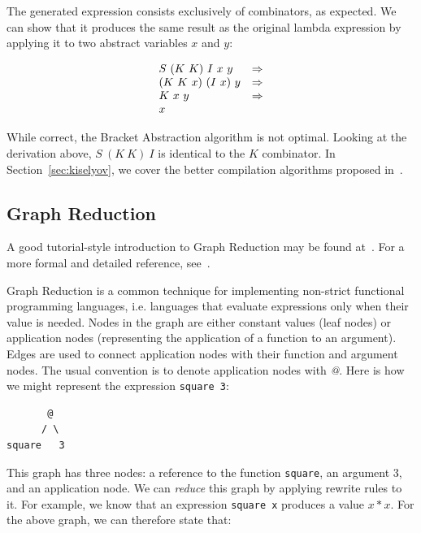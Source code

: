 \documentclass[conference]{IEEEtran}
\begin{document}
The generated expression consists exclusively of combinators, as expected.
We can show that it produces the same result as the original lambda expression by applying it to two abstract variables $x$ and $y$:

\begin{equation*}
    \begin{array}{l l}
        S\ (K\ K)\ I\ x\ y   & \Rightarrow \\
        (K\ K\ x)\ (I\ x)\ y & \Rightarrow \\
        K\ x\ y              & \Rightarrow \\
        x                    &             \\
    \end{array}
\end{equation*}

While correct, the Bracket Abstraction algorithm is not optimal.
Looking at the derivation above, $S\ (K\ K)\ I$ is identical to the $K$ combinator.
In Section~\ref{sec:kiselyov}, we cover the better compilation algorithms proposed in~\cite{kiselyov_lambda_2018}.

\subsection{Graph Reduction}
A good tutorial-style introduction to Graph Reduction may be found at~\cite{peyton_jones_implementing_2000}.
For a more formal and detailed reference, see~\cite{spj_impl}.

Graph Reduction is a common technique for implementing non-strict functional programming languages, i.e. languages that evaluate expressions only when their value is needed.
Nodes in the graph are either constant values (leaf nodes) or application nodes (representing the application of a function to an argument).
Edges are used to connect application nodes with their function and argument nodes.
The usual convention is to denote application nodes with \emph{@}.
Here is how we might represent the expression \texttt{square 3}:

\begin{verbatim}
       @
      / \
square   3
\end{verbatim}

This graph has three nodes: a reference to the function \texttt{square}, an argument 3, and an application node.
We can \emph{reduce} this graph by applying rewrite rules to it. For example, we know that an expression \texttt{square x} produces a value $x*x$.
For the above graph, we can therefore state that:
\end{document}
